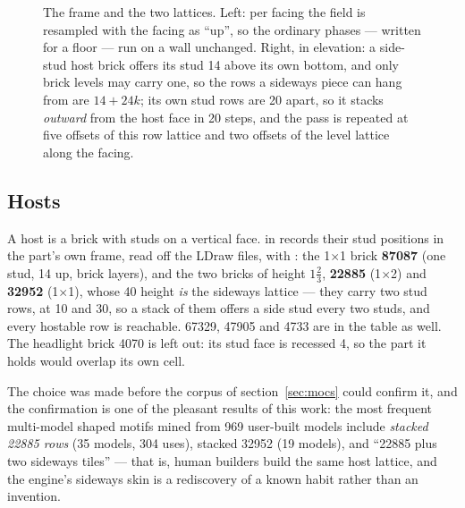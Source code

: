 \begin{figure}[h]
\caption{The frame and the two lattices. Left: per facing the field is resampled with the facing as ``up'', so the ordinary phases
--- written for a floor --- run on a wall unchanged. Right, in elevation: a side-stud host brick offers its stud 14\ldu{} above its
own bottom, and only brick levels may carry one, so the rows a sideways piece can hang from are $14 + 24k$; its own stud rows are
20\ldu{} apart, so it stacks \emph{outward} from the host face in 20\ldu{} steps, and the pass is repeated at five offsets of this
row lattice and two offsets of the level lattice along the facing.}
\label{fig:walllattice}
\end{figure}

\subsection{Hosts}
A host is a brick with studs on a vertical face.  in  records their stud positions in the part's own
frame, read off the LDraw files, with : the 1$\times$1 brick \textbf{87087} (one stud, 14\ldu{} up, brick layers), and
the two bricks of height $1\frac{2}{3}$, \textbf{22885} (1$\times$2) and \textbf{32952} (1$\times$1), whose 40\ldu{} height \emph{is}
the sideways lattice --- they carry two stud rows, at 10 and 30\ldu, so a stack of them offers a side stud every two studs, and
every hostable row is reachable. 67329, 47905 and 4733 are in the table as well. The headlight brick 4070 is left out: its stud
face is recessed 4\ldu, so the part it holds would overlap its own cell.

The choice was made before the corpus of section~\ref{sec:mocs} could confirm it, and the confirmation is one of the pleasant
results of this work: the most frequent multi-model shaped motifs mined from 969 user-built models include \emph{stacked 22885
rows} (35 models, 304 uses), stacked 32952 (19 models), and ``22885 plus two sideways tiles'' --- that is, human builders build the
same host lattice, and the engine's sideways skin is a rediscovery of a known habit rather than an invention.

